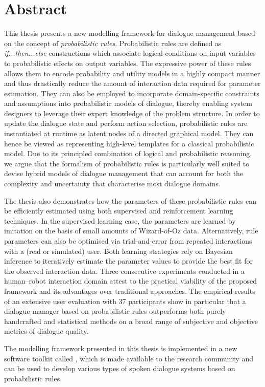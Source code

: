 \chapter*{Abstract}

This thesis presents a new modelling framework for dialogue management based on the concept of \textit{probabilistic rules}.  Probabilistic rules are defined as \textit{if...then...else} constructions which associate logical conditions on input variables to probabilistic effects on output variables. The expressive power of these rules allows them to encode probability and utility models in a highly compact manner and thus drastically reduce the amount of interaction data required for parameter estimation. They can also be employed to incorporate domain-specific constraints and assumptions into probabilistic models of dialogue, thereby enabling system designers to leverage their expert knowledge of the problem structure.  In order to update the dialogue state and perform action selection, probabilistic rules are instantiated at runtime as latent nodes of a directed graphical model.  They can hence be viewed as representing high-level templates for a classical probabilistic model. Due to its principled combination of logical and probabilistic reasoning, we argue that the formalism of probabilistic rules is particularly well suited to devise hybrid models of dialogue management that can account for both the complexity and uncertainty that characterise most dialogue domains.

The thesis also demonstrates how the parameters of these probabilistic rules can be efficiently estimated using both supervised and reinforcement learning techniques. In the supervised learning case, the parameters are learned by imitation on the basis of small amounts of Wizard-of-Oz data.  Alternatively, rule parameters can also be optimised via trial-and-error from repeated interactions with a (real or simulated) user. Both learning strategies rely on Bayesian inference to iteratively estimate the parameter values to provide the best fit for the observed interaction data. Three consecutive experiments conducted in a human--robot interaction domain attest to the practical viability of the proposed framework and its advantages over traditional approaches.  The empirical results of an extensive user evaluation with 37 participants show in particular that a dialogue manager based on probabilistic rules outperforms both purely handcrafted and statistical methods on a broad range of subjective and objective metrics of dialogue quality.

The modelling framework presented in this thesis is implemented in a new software toolkit called \opendial{}, which is made available to the research community and can be used to develop various types of spoken dialogue systems based on probabilistic rules. 
